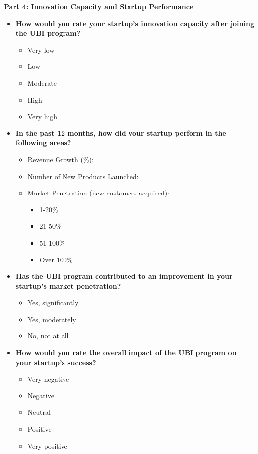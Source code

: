 \documentclass[../Main.tex]{subfiles}%
\begin{document}
	\textbf{Part 4: Innovation Capacity and Startup Performance}
	\begin{itemize}
		\item \textbf{How would you rate your startup's innovation capacity after joining the UBI program?}
		\begin{itemize}
			\item Very low
			\item Low
			\item Moderate
			\item High
			\item Very high
		\end{itemize}
		\item \textbf{In the past 12 months, how did your startup perform in the following areas?}
		\begin{itemize}
			\item Revenue Growth (\%): \underline{\hspace{4cm}}
			\item Number of New Products Launched: \underline{\hspace{4cm}}
			\item Market Penetration (new customers acquired):
			\begin{itemize}
				\item 1-20\%
				\item 21-50\%
				\item 51-100\%
				\item Over 100\%
			\end{itemize}
		\end{itemize}
		\item \textbf{Has the UBI program contributed to an improvement in your startup's market penetration?}
		\begin{itemize}
			\item Yes, significantly
			\item Yes, moderately
			\item No, not at all
		\end{itemize}
		\item \textbf{How would you rate the overall impact of the UBI program on your startup's success?}
		\begin{itemize}
			\item Very negative
			\item Negative
			\item Neutral
			\item Positive
			\item Very positive
		\end{itemize}
	\end{itemize}
	
\end{document}

